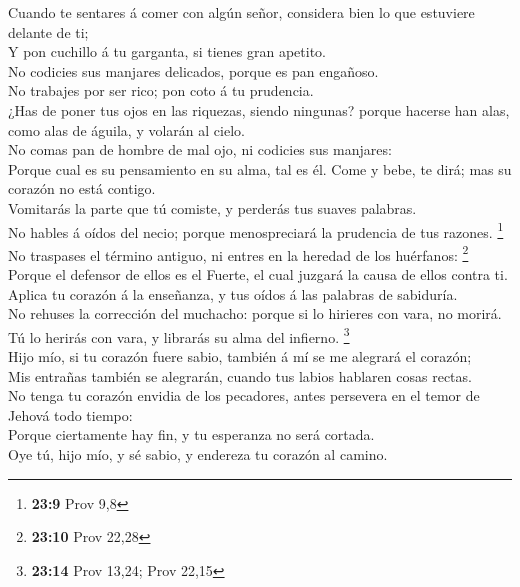  Cuando te sentares á comer con algún señor, considera bien
lo que estuviere delante de ti;\\
 Y pon cuchillo á tu garganta, si tienes gran apetito.\\
 No codicies sus manjares delicados, porque es pan
engañoso.\\
 No trabajes por ser rico; pon coto á tu prudencia.\\
 ¿Has de poner tus ojos en las riquezas, siendo ningunas?
porque hacerse han alas, como alas de águila, y volarán al cielo.\\
 No comas pan de hombre de mal ojo, ni codicies sus
manjares:\\
 Porque cual es su pensamiento en su alma, tal es él. Come y
bebe, te dirá; mas su corazón no está contigo.\\
 Vomitarás la parte que tú comiste, y perderás tus suaves
palabras.\\
 No hables á oídos del necio; porque menospreciará la
prudencia de tus razones. \footnote{\textbf{23:9} Prov 9,8}\\
 No traspases el término antiguo, ni entres en la heredad
de los huérfanos: \footnote{\textbf{23:10} Prov 22,28}\\
 Porque el defensor de ellos es el Fuerte, el cual juzgará
la causa de ellos contra ti.\\
 Aplica tu corazón á la enseñanza, y tus oídos á las
palabras de sabiduría.\\
 No rehuses la corrección del muchacho: porque si lo
hirieres con vara, no morirá.\\
 Tú lo herirás con vara, y librarás su alma del infierno.
\footnote{\textbf{23:14} Prov 13,24; Prov 22,15}\\
 Hijo mío, si tu corazón fuere sabio, también á mí se me
alegrará el corazón;\\
 Mis entrañas también se alegrarán, cuando tus labios
hablaren cosas rectas.\\
 No tenga tu corazón envidia de los pecadores, antes
persevera en el temor de Jehová todo tiempo:\\
 Porque ciertamente hay fin, y tu esperanza no será
cortada.\\
 Oye tú, hijo mío, y sé sabio, y endereza tu corazón al
camino.\\
